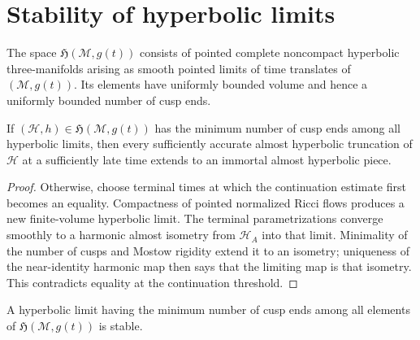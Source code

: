 \section{Stability of hyperbolic limits}

\begin{definition}
\label{def:chow-iv-space-hyperbolic-limits}
The space \(\mathfrak H(\mathcal M,g(t))\) consists of pointed complete
noncompact hyperbolic three-manifolds arising as smooth pointed limits of time
translates of \((\mathcal M,g(t))\).  Its elements have uniformly bounded
volume and hence a uniformly bounded number of cusp ends.
\end{definition}

\begin{proposition}
\label{prop:chow-iv-minimal-cusp-pieces-immortal}
If \((\mathcal H,h)\in\mathfrak H(\mathcal M,g(t))\) has the minimum number
of cusp ends among all hyperbolic limits, then every sufficiently accurate
almost hyperbolic truncation of \(\mathcal H\) at a sufficiently late time
extends to an immortal almost hyperbolic piece.
\end{proposition}

\begin{proof}
Otherwise, choose terminal times at which the continuation estimate first
becomes an equality.  Compactness of pointed normalized Ricci flows produces a
new finite-volume hyperbolic limit.  The terminal parametrizations converge
smoothly to a harmonic almost isometry from \(\mathcal H_A\) into that limit.
Minimality of the number of cusps and Mostow rigidity extend it to an isometry;
uniqueness of the near-identity harmonic map then says that the limiting map is
that isometry.  This contradicts equality at the continuation threshold.
\end{proof}

\begin{theorem}
\label{thm:chow-iv-minimal-cusp-limit-stable}
A hyperbolic limit having the minimum number of cusp ends among all elements of
\(\mathfrak H(\mathcal M,g(t))\) is stable.
\end{theorem}


